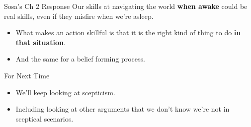 \documentclass[
  17pt,
  letterpaper,
  ignorenonframetext,
  aspectratio=169,
  handout]{beamer}
\providecommand{\tightlist}{%
  \setlength{\itemsep}{0pt}\setlength{\parskip}{0pt}}\usepackage{longtable,booktabs,array}
\begin{document}
\begin{frame}{Sosa's Ch 2 Response}
\protect\hypertarget{sosas-ch-2-response-1}{}
Our skills at navigating the world \textbf{when awake} could be real
skills, even if they misfire when we're asleep.

\begin{itemize}[<+->]
\tightlist
\item
  What makes an action skillful is that it is the right kind of thing to
  do \textbf{in that situation}.
\item
  And the same for a belief forming process.
\end{itemize}
\end{frame}

\begin{frame}{For Next Time}
\protect\hypertarget{for-next-time}{}
\begin{itemize}[<+->]
\tightlist
\item
  We'll keep looking at scepticism.
\item
  Including looking at other arguments that we don't know we're not in
  sceptical scenarios.
\end{itemize}
\end{frame}
\end{document}

